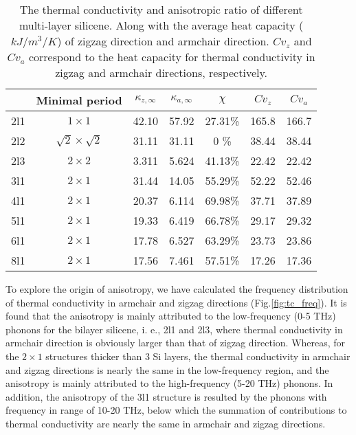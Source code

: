 \documentclass[aps,prb,twocolumn,showpacs,amsmath,amssymb]{revtex4-1}
\begin{document}
\begin{table*}
  \caption{\label{tab:table1}
    The thermal conductivity and anisotropic ratio of different multi-layer silicene. Along with the average heat capacity ($kJ/m^3/K$) of zigzag direction and armchair direction. $Cv_z$ and $Cv_a$ correspond to the  heat capacity for thermal conductivity in  zigzag and armchair directions, respectively. }
  \begin{ruledtabular}
    \begin{tabular}{ccccccc}
          & Minimal period
          & $\kappa_{z,\infty}$
          & $\kappa_{a,\infty}$
          & $\chi$
          & $Cv_{z}$
          & $Cv_{a}$                                                           \\
      \hline
      2l1 & $1 \times 1$             & 42.10 & 57.92 & 27.31\% & 165.8 & 166.7 \\
      2l2 & $\sqrt{2}\times\sqrt{2}$ & 31.11 & 31.11 & 0    \% & 38.44 & 38.44 \\
      2l3 & $2 \times 2$             & 3.311 & 5.624 & 41.13\% & 22.42 & 22.42 \\
      3l1 & $2 \times 1$             & 31.44 & 14.05 & 55.29\% & 52.22 & 52.46 \\
      4l1 & $2 \times 1$             & 20.37 & 6.114 & 69.98\% & 37.71 & 37.89 \\
      5l1 & $2 \times 1$             & 19.33 & 6.419 & 66.78\% & 29.17 & 29.32 \\
      6l1 & $2 \times 1$             & 17.78 & 6.527 & 63.29\% & 23.73 & 23.86 \\
      8l1 & $2 \times 1$             & 17.56 & 7.461 & 57.51\% & 17.26 & 17.36 \\
    \end{tabular}
  \end{ruledtabular}
\end{table*}

To explore the origin of anisotropy, we have calculated the frequency distribution of thermal conductivity in armchair and zigzag directions  (Fig.\ref{fig:tc_freq}).
It is found that the  anisotropy is mainly attributed to the low-frequency (0-5 THz) phonons for the bilayer silicene, i. e., 2l1 and 2l3, where thermal conductivity in armchair direction is obviously larger than that of zigzag direction.
Whereas, for the $2\times1$ structures thicker than 3 Si layers, the thermal conductivity in armchair and zigzag directions is nearly the same in the low-frequency region, and the anisotropy is mainly  attributed to the high-frequency (5-20 THz) phonons.
In addition, the anisotropy of the 3l1 structure is resulted by the  phonons with frequency in range of 10-20 THz, below which the summation of contributions to thermal conductivity are nearly the same in armchair and zigzag directions.
\end{document}
